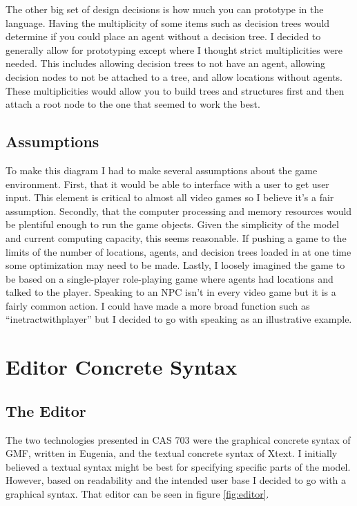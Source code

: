 \documentclass[letterpaper,12pt]{article}  %
\begin{document}
The other big set of design decisions is how much you can prototype in the language. Having the multiplicity of some items such as decision trees would determine if you could place an agent without a decision tree. I decided to generally allow for prototyping except where I thought strict multiplicities were needed. This includes allowing decision trees to not have an agent, allowing decision nodes to not be attached to a tree, and allow locations without agents. These multiplicities would allow you to build trees and structures first and then attach a root node to the one that seemed to work the best.

\subsection{Assumptions}
To make this diagram I had to make several assumptions about the game environment. First, that it would be able to interface with a user to get user input. This element is critical to almost all video games so I believe it’s a fair assumption. Secondly, that the computer processing and memory resources would be plentiful enough to run the game objects. Given the simplicity of the model and current computing capacity, this seems reasonable. If pushing a game to the limits of the number of locations, agents, and decision trees loaded in at one time some optimization may need to be made. Lastly, I loosely imagined the game to be based on a single-player role-playing game where agents had locations and talked to the player. Speaking to an NPC isn’t in every video game but it is a fairly common action. I could have made a more broad function such as “inetractwithplayer” but I decided to go with speaking as an illustrative example.





\section{Editor Concrete Syntax}
\subsection{The Editor}
The two technologies presented in CAS 703 were the graphical concrete syntax of GMF, written in Eugenia, and the textual concrete syntax of Xtext. I initially believed a textual syntax might be best for specifying specific parts of the model. However, based on readability and the intended user base I decided to go with a graphical syntax. That editor can be seen in figure \ref{fig:editor}.
\end{document}
